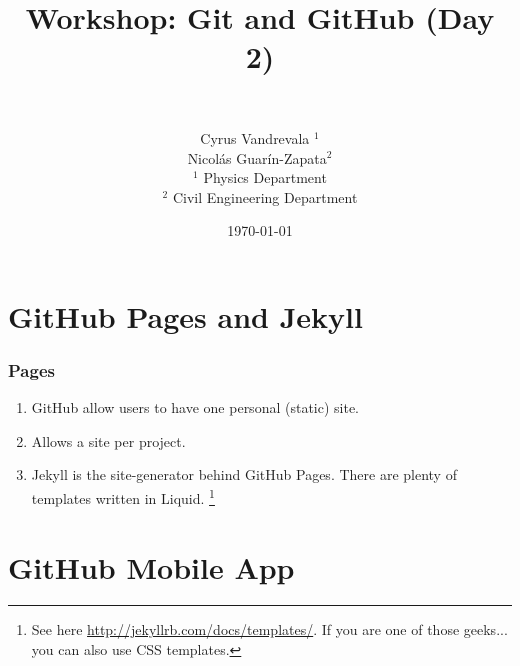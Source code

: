 


\title{Workshop: Git and GitHub (Day 2)}
\subtitle{~}
\author[AUTHOR]{\scriptsize{Cyrus Vandrevala $^1$\\Nicol\'as Guar\'in-Zapata$^2$}\\
\tiny{$^1$ Physics Department\\ $^2$ Civil Engineering Department}}
\date{\today}







\section[GitHub Pages]{GitHub Pages and Jekyll}

\begin{frame}
    \frametitle{Pages}
    
    \begin{enumerate}
    \item GitHub allow users to have one personal (static) site. \pause
    
    \item Allows a site per project. \pause
    
    \item Jekyll is the site-generator behind GitHub Pages. There are plenty of templates written in Liquid. \footnote{See here \url{http://jekyllrb.com/docs/templates/}. If you are one of those geeks... you can also use CSS templates.}

    \end{enumerate}
\end{frame}
\note{}      

\section[Mobile App]{GitHub Mobile App}

